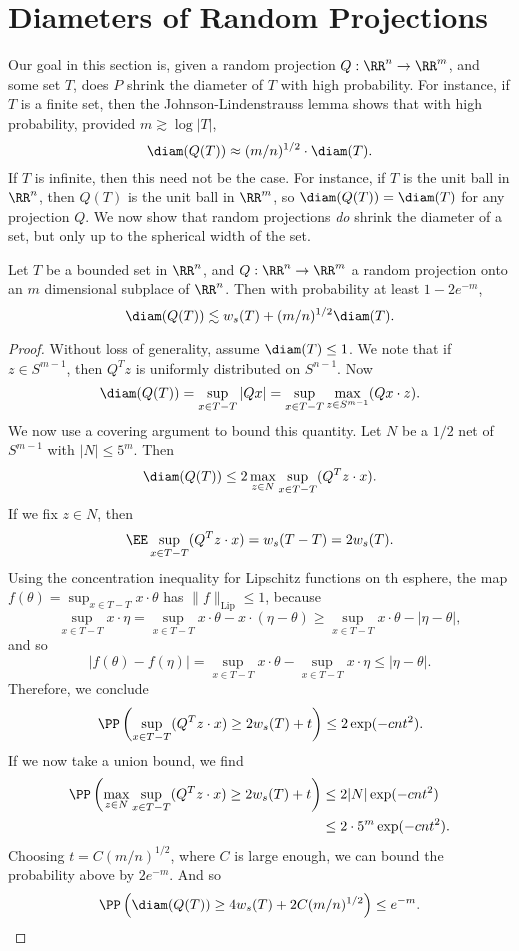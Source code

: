\section{Diameters of Random Projections}

Our goal in this section is, given a random projection $Q: \RR^n \to \RR^m$, and some set $T$, does $P$ shrink the diameter of $T$ with high probability. For instance, if $T$ is a finite set, then the Johnson-Lindenstrauss lemma shows that with high probability, provided $m \gtrsim \log |T|$,
%
\[ \diam(Q(T)) \approx (m/n)^{1/2} \cdot \diam(T). \]
%
If $T$ is infinite, then this need not be the case. For instance, if $T$ is the unit ball in $\RR^n$, then $Q(T)$ is the unit ball in $\RR^m$, so $\diam(Q(T)) = \diam(T)$ for any projection $Q$. We now show that random projections {\it do} shrink the diameter of a set, but only up to the spherical width of the set.

\begin{theorem}
	Let $T$ be a bounded set in $\RR^n$, and $Q: \RR^n \to \RR^m$ a random projection onto an $m$ dimensional subplace of $\RR^n$. Then with probability at least $1 - 2 e^{-m}$,
	\[ \diam(Q(T)) \lesssim w_s(T) + (m/n)^{1/2} \diam(T). \]
\end{theorem}
\begin{proof}
	Without loss of generality, assume $\diam(T) \leq 1$. We note that if $z \in S^{m-1}$, then $Q^T z$ is uniformly distributed on $S^{n-1}$. Now
	\[ \diam(Q(T)) = \sup_{x \in T-T} |Qx| = \sup_{x \in T-T} \max_{z \in S^{m-1}} (Qx \cdot z). \]
	We now use a covering argument to bound this quantity. Let $N$ be a $1/2$ net of $S^{m-1}$ with $|N| \leq 5^m$. Then
	\[ \diam(Q(T)) \leq 2 \max_{z \in N} \sup_{x \in T-T} (Q^Tz \cdot x). \]
	If we fix $z \in N$, then
	\[ \EE \sup_{x \in T-T} (Q^T z \cdot x) = w_s(T-T) = 2w_s(T). \]
	Using the concentration inequality for Lipschitz functions on th esphere, the map $f(\theta) =  \sup_{x \in T-T} x \cdot \theta$ has $\| f \|_{\text{Lip}} \leq 1$, because
	\[ \sup_{x \in T-T} x \cdot \eta = \sup_{x \in T-T} x \cdot \theta - x \cdot (\eta - \theta) \geq \sup_{x \in T-T} x \cdot \theta - |\eta - \theta|, \]
	and so
	\[ |f(\theta) - f(\eta)| = \sup_{x \in T-T} x \cdot \theta - \sup_{x \in T-T} x \cdot \eta \leq |\eta - \theta|. \]
	Therefore, we conclude
	\[ \PP \left( \sup_{x \in T-T} (Q^T z \cdot x) \geq 2 w_s(T) + t \right) \leq 2 \exp(-cnt^2). \]
	If we now take a union bound, we find
	\begin{align*}
		\PP \left( \max_{z \in N} \sup_{x \in T-T} (Q^Tz \cdot x) \geq 2w_s(T) + t \right) &\leq 2 |N| \exp(-cnt^2)\\
		&\leq 2 \cdot 5^m \exp(-cnt^2).
	\end{align*}
	Choosing $t = C (m/n)^{1/2}$, where $C$ is large enough, we can bound the probability above by $2 e^{-m}$. And so
	\[ \PP \left( \diam(Q(T)) \geq 4w_s(T) + 2C (m/n)^{1/2} \right) \leq e^{-m}. \qedhere \]
\end{proof}


